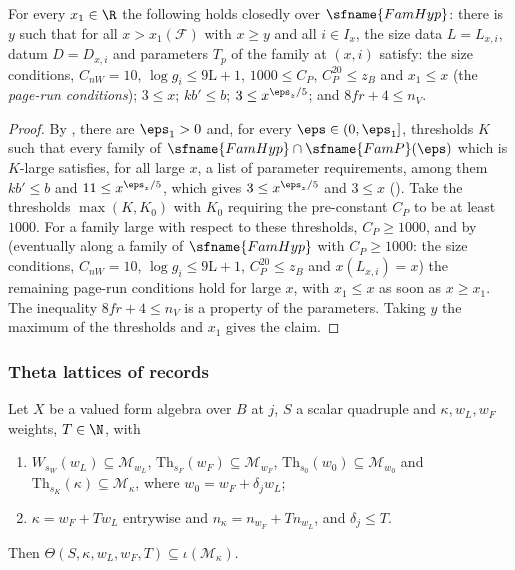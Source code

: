 \begin{lemma}\label{pf:onto3:pagenum}
For every $x_1\in\R$ the following holds closedly over $\sfname{FamHyp}$: there is $y$ such that for all $x>x_1(\mathcal F)$
with $x\ge y$ and all $i\in I_x$, the size data $L=L_{x,i}$, datum $D=D_{x,i}$ and parameters $T_p$ of the family at
$(x,i)$ satisfy: the size conditions, $C_{nW}=10$, $\log g_i\le9\mathrm L+1$, $1000\le C_P$, $C_P^{20}\le z_B$ and $x_1\le
x$ (the \emph{page-run conditions}); $3\le x$; $kb'\le b$; $3\le x^{\eps_z/5}$; and $8fr+4\le n_V$.
\end{lemma}

\begin{proof}
By , there are $\eps_1>0$ and, for every
$\eps\in(0,\eps_1]$, thresholds $K$ such that every family of $\sfname{FamHyp}\cap\sfname{FamP}(\eps)$ which is $K$-large
satisfies, for all large $x$, a list of parameter requirements, among them $kb'\le b$ and $11\le x^{\eps_z/5}$, which
gives $3\le x^{\eps_z/5}$ and $3\le x$ (). Take the
thresholds $\max(K,K_0)$ with $K_0$ requiring the pre-constant $C_P$
to be at least $1000$. For a family large with respect to these thresholds, $C_P\ge1000$, and by
 (eventually along a family of $\sfname{FamHyp}$ with $C_P\ge1000$: the size
conditions, $C_{nW}=10$, $\log g_i\le9\mathrm L+1$, $C_P^{20}\le z_B$ and $x(L_{x,i})=x$) the remaining page-run conditions hold
for large $x$, with $x_1\le x$ as soon as $x\ge x_1$. The inequality $8fr+4\le n_V$ is a property of the parameters. Taking
$y$ the maximum of the thresholds and $x_1$ gives the claim.
\end{proof}

\subsubsection{Theta lattices of records}

\begin{lemma}\label{pf:onto3:thetamsup}
Let $X$ be a valued form algebra over $B$ at $j$, $S$ a scalar quadruple and $\kappa,w_L,w_F$ weights, $T\in\N$, with
\begin{enumerate}[label=(\alph*)]
\item $W_{s_W}(w_L)\subseteq\mathcal M_{w_L}$, $\mathrm{Th}_{s_F}(w_F)\subseteq\mathcal M_{w_F}$, $\mathrm{Th}_{s_0}(w_0)\subseteq
\mathcal M_{w_0}$ and $\mathrm{Th}_{s_K}(\kappa)\subseteq\mathcal M_\kappa$, where $w_0=w_F+\delta_jw_L$;
\item $\kappa=w_F+Tw_L$ entrywise and $n_\kappa=n_{w_F}+Tn_{w_L}$, and $\delta_j\le T$.
\end{enumerate}
Then $\Theta(S,\kappa,w_L,w_F,T)\subseteq\iota(\mathcal M_\kappa)$.
\end{lemma}

